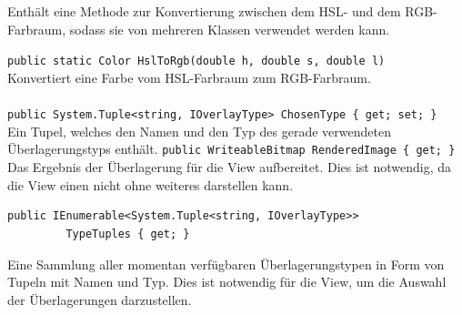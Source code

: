 \paragraph{}~\\
Enthält eine Methode zur Konvertierung zwischen dem HSL- und dem RGB-Farbraum, sodass sie von mehreren Klassen verwendet werden kann.
\begin{itemize}
	\add \verb!public static Color HslToRgb(double h, double s, double l)! \\
	Konvertiert eine Farbe vom HSL-Farbraum zum RGB-Farbraum.
\end{itemize}

\paragraph{}
\begin{itemize}
	\add \verb!public System.Tuple<string, IOverlayType> ChosenType { get; set; }! \\
	Ein Tupel, welches den Namen und den Typ des gerade verwendeten Überlagerungstyps enthält.
	\add \verb!public WriteableBitmap RenderedImage { get; }! \\
	Das Ergebnis der Überlagerung für die View aufbereitet. Dies ist notwendig, da die View einen  nicht ohne weiteres darstellen kann.
	\add \begin{verbatim}public IEnumerable<System.Tuple<string, IOverlayType>>
	     TypeTuples { get; }
	     \end{verbatim}
	Eine Sammlung aller momentan verfügbaren Überlagerungstypen in Form von Tupeln mit Namen und Typ. Dies ist notwendig für die View, um die Auswahl der Überlagerungen darzustellen.
\end{itemize}
\newpage

\subsection{}

